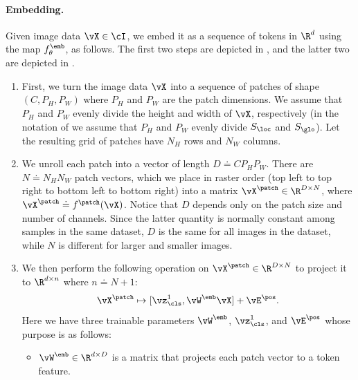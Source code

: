 \documentclass[../../book-main.tex]{subfiles}
\begin{document}
\paragraph{Embedding.} Given image data \(\vX \in \cI\), we embed it
as a sequence of tokens in \(\R^{d}\) using the map
\(f_{\theta}^{\emb}\), as follows.
The first two steps are depicted
in , and the latter two are depicted in
.
\begin{enumerate}
    \item First, we turn the image data \(\vX\) into a sequence of
        patches of shape \((C, P_{H}, P_{W})\) where \(P_{H}\) and
        \(P_{W}\) are the patch dimensions.
        We assume that \(P_{H}\)
        and \(P_{W}\) evenly divide the height and width of \(\vX\),
        respectively (in the notation of
             we assume that
            \(P_{H}\) and \(P_{W}\) evenly divide \(S_{\loc}\) and
        \(S_{\glo}\)).
        Let the resulting grid of patches have
        \(N_{H}\) rows and \(N_{W}\) columns.
    \item We unroll each patch into a vector of length \(D \doteq
        CP_{H}P_{W}\).
        There are \(N \doteq N_{H}N_{W}\) patch
        vectors, which we place in raster order (top left to
        top right to bottom left to bottom right) into a
        matrix \(\vX^{\patch} \in \R^{D \times N}\), where
        \(\vX^{\patch} \doteq f^{\patch}(\vX)\).
        Notice that \(D\)
        depends only on the patch size and number of channels.
        Since
        the latter quantity is normally constant among samples in the
        same dataset, \(D\) is the same for all images in the
        dataset, while \(N\) is different for larger and smaller images.
    \item We then perform the following operation on \(\vX^{\patch}
        \in \R^{D \times N}\) to project it to \(\R^{d \times n}\)
        where \(n \doteq N + 1\):
        \begin{equation}
            \vX^{\patch} \mapsto [\vz_{\cls}^{1}, \vW^{\emb}\vX] + \vE^{\pos} .
        \end{equation}
        Here we have three trainable parameters \(\vW^{\emb}\),
        \(\vz_{\cls}^{1}\), and \(\vE^{\pos}\) whose purpose is as follows:
        \begin{itemize}
            \item \(\vW^{\emb} \in \R^{d \times D}\) is a matrix
                that projects each patch vector to a token feature.

\end{itemize}
\end{enumerate}
\end{document}
